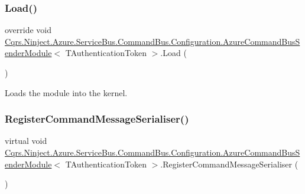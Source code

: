 \subsubsection{\texorpdfstring{Load()}{Load()}}
{\footnotesize\ttfamily override void \hyperlink{classCqrs_1_1Ninject_1_1Azure_1_1ServiceBus_1_1CommandBus_1_1Configuration_1_1AzureCommandBusSenderModule}{Cqrs.\+Ninject.\+Azure.\+Service\+Bus.\+Command\+Bus.\+Configuration.\+Azure\+Command\+Bus\+Sender\+Module}$<$ T\+Authentication\+Token $>$.Load (\begin{DoxyParamCaption}{ }\end{DoxyParamCaption})}



Loads the module into the kernel. 

\mbox{\label{classCqrs_1_1Ninject_1_1Azure_1_1ServiceBus_1_1CommandBus_1_1Configuration_1_1AzureCommandBusSenderModule_a9a40a7924b1adaa02b95e5d244ff5e82_a9a40a7924b1adaa02b95e5d244ff5e82}} 
\subsubsection{\texorpdfstring{Register\+Command\+Message\+Serialiser()}{RegisterCommandMessageSerialiser()}}
{\footnotesize\ttfamily virtual void \hyperlink{classCqrs_1_1Ninject_1_1Azure_1_1ServiceBus_1_1CommandBus_1_1Configuration_1_1AzureCommandBusSenderModule}{Cqrs.\+Ninject.\+Azure.\+Service\+Bus.\+Command\+Bus.\+Configuration.\+Azure\+Command\+Bus\+Sender\+Module}$<$ T\+Authentication\+Token $>$.Register\+Command\+Message\+Serialiser (\begin{DoxyParamCaption}{ }\end{DoxyParamCaption})\hspace{0.3cm}{\ttfamily [virtual]}}



